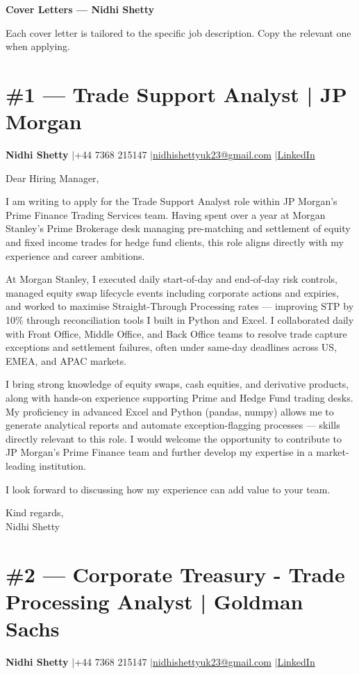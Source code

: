 \documentclass[11pt,a4paper]{article}
\makeatletter
\newcommand{\coverheader}{%
\begin{flushleft}
{\bfseries Nidhi Shetty} \enspace$\vert$\enspace +44 7368 215147 \enspace$\vert$\enspace \href{mailto:nidhishettyuk23@gmail.com}{nidhishettyuk23@gmail.com} \enspace$\vert$\enspace \href{https://www.linkedin.com/in/nidhi-shetty23-1841b7181}{LinkedIn}
\end{flushleft}
\vspace{4pt}
}
\makeatother
\begin{document}
{\LARGE\bfseries\color{primary} Cover Letters --- Nidhi Shetty}

\vspace{4pt}
{\small Each cover letter is tailored to the specific job description. Copy the relevant one when applying.}

\section{\#1 --- Trade Support Analyst | JP Morgan}
\coverheader

Dear Hiring Manager,

I am writing to apply for the Trade Support Analyst role within JP Morgan's Prime Finance Trading Services team. Having spent over a year at Morgan Stanley's Prime Brokerage desk managing pre-matching and settlement of equity and fixed income trades for hedge fund clients, this role aligns directly with my experience and career ambitions.

At Morgan Stanley, I executed daily start-of-day and end-of-day risk controls, managed equity swap lifecycle events including corporate actions and expiries, and worked to maximise Straight-Through Processing rates --- improving STP by 10\% through reconciliation tools I built in Python and Excel. I collaborated daily with Front Office, Middle Office, and Back Office teams to resolve trade capture exceptions and settlement failures, often under same-day deadlines across US, EMEA, and APAC markets.

I bring strong knowledge of equity swaps, cash equities, and derivative products, along with hands-on experience supporting Prime and Hedge Fund trading desks. My proficiency in advanced Excel and Python (pandas, numpy) allows me to generate analytical reports and automate exception-flagging processes --- skills directly relevant to this role. I would welcome the opportunity to contribute to JP Morgan's Prime Finance team and further develop my expertise in a market-leading institution.

I look forward to discussing how my experience can add value to your team.

\vspace{8pt}
Kind regards,\\
Nidhi Shetty

\newpage
\section{\#2 --- Corporate Treasury - Trade Processing Analyst | Goldman Sachs}
\coverheader
\end{document}
